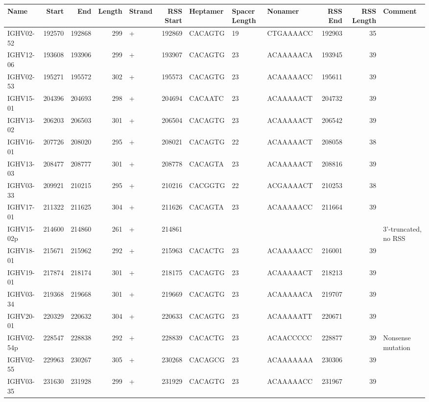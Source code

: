 \begin{tabular}{lrrrlrlllrrl}
  \toprule Name & Start & End & Length & Strand & RSS Start & Heptamer & Spacer Length & Nonamer & RSS End & RSS Length & Comment \\ 
  \midrule IGHV02-52 & 192570 & 192868 & 299 & + & 192869 & CACAGTG & 19 & CTGAAAACC & 192903 & 35 &  \\ 
  IGHV12-06 & 193608 & 193906 & 299 & + & 193907 & CACAGTG & 23 & ACAAAAACA & 193945 & 39 &  \\ 
  IGHV02-53 & 195271 & 195572 & 302 & + & 195573 & CACAGTG & 23 & ACAAAAACC & 195611 & 39 &  \\ 
  IGHV15-01 & 204396 & 204693 & 298 & + & 204694 & CACAATC & 23 & ACAAAAACT & 204732 & 39 &  \\ 
  IGHV13-02 & 206203 & 206503 & 301 & + & 206504 & CACAGTG & 23 & ACAAAAACT & 206542 & 39 &  \\ 
  IGHV16-01 & 207726 & 208020 & 295 & + & 208021 & CACAGTG & 22 & ACAAAAACT & 208058 & 38 &  \\ 
  IGHV13-03 & 208477 & 208777 & 301 & + & 208778 & CACAGTA & 23 & ACAAAAACT & 208816 & 39 &  \\ 
  IGHV03-33 & 209921 & 210215 & 295 & + & 210216 & CACGGTG & 22 & ACGAAAACT & 210253 & 38 &  \\ 
  IGHV17-01 & 211322 & 211625 & 304 & + & 211626 & CACAGTA & 23 & ACAAAAACC & 211664 & 39 &  \\ 
  IGHV15-02p & 214600 & 214860 & 261 & + & 214861 &  &  &  &  &  & 3'-truncated, no RSS \\ 
  IGHV18-01 & 215671 & 215962 & 292 & + & 215963 & CACACTG & 23 & ACAAAAACC & 216001 & 39 &  \\ 
  IGHV19-01 & 217874 & 218174 & 301 & + & 218175 & CACAGTG & 23 & ACAAAAACT & 218213 & 39 &  \\ 
  IGHV03-34 & 219368 & 219668 & 301 & + & 219669 & CACAGTG & 23 & ACAAAAACA & 219707 & 39 &  \\ 
  IGHV20-01 & 220329 & 220632 & 304 & + & 220633 & CACAGTG & 23 & ACAAAAATT & 220671 & 39 &  \\ 
  IGHV02-54p & 228547 & 228838 & 292 & + & 228839 & CACACTG & 23 & ACAACCCCC & 228877 & 39 & Nonsense mutation \\ 
  IGHV02-55 & 229963 & 230267 & 305 & + & 230268 & CACAGCG & 23 & ACAAAAAAA & 230306 & 39 &  \\ 
  IGHV03-35 & 231630 & 231928 & 299 & + & 231929 & CACAGTG & 23 & ACAAAAACC & 231967 & 39 &  \\ 

\end{tabular}
